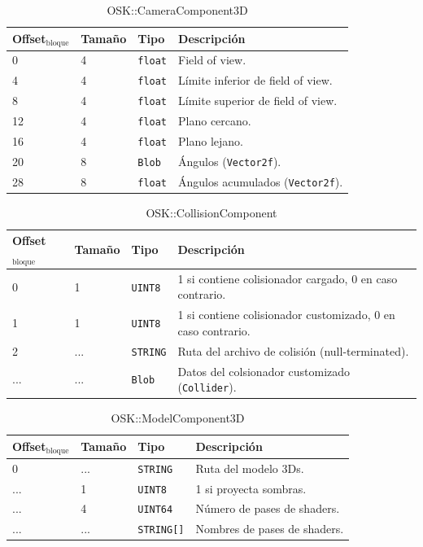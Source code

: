 \documentclass[12pt,a4paper]{article}
\begin{document}
\begin{table}[h]
\caption{OSK::CameraComponent3D}
\center
\begin{tabular}{llll}
\hline
Offset$_\text{bloque}$ & Tamaño & Tipo & Descripción \\ \hline
0 & 4 & \texttt{float} & Field of view. \\
4 & 4 & \texttt{float} & Límite inferior de field of view. \\
8 & 4 & \texttt{float} & Límite superior de field of view. \\
12 & 4 & \texttt{float} & Plano cercano. \\
16 & 4 & \texttt{float} & Plano lejano. \\
20 & 8 & \texttt{Blob} & Ángulos (\texttt{Vector2f}). \\
28 & 8 & \texttt{float} & Ángulos acumulados (\texttt{Vector2f}). \\
\hline
\end{tabular}
\end{table}

\begin{table}[h]
\caption{OSK::CollisionComponent}
\center
\begin{tabular}{llll}
\hline
Offset$_\text{bloque}$ & Tamaño & Tipo & Descripción \\ \hline
0 & 1 & \texttt{UINT8} & 1 si contiene colisionador cargado, 0 en caso contrario. \\
1 & 1 & \texttt{UINT8} & 1 si contiene colisionador customizado, 0 en caso contrario. \\
2 & ... & \texttt{STRING} & Ruta del archivo de colisión (null-terminated). \\
... & ... & \texttt{Blob} & Datos del colsionador customizado (\texttt{Collider}). \\
\hline
\end{tabular}
\end{table}

\begin{table}[h]
\caption{OSK::ModelComponent3D}
\center
\begin{tabular}{llll}
\hline
Offset$_\text{bloque}$ & Tamaño & Tipo & Descripción \\ \hline
0 & ... & \texttt{STRING} & Ruta del modelo 3Ds. \\
... & 1 & \texttt{UINT8} & 1 si proyecta sombras. \\
... & 4 & \texttt{UINT64} & Número de pases de shaders. \\
... & ... & \texttt{STRING[]} & Nombres de pases de shaders. \\
\hline
\end{tabular}
\end{table}
\end{document}
